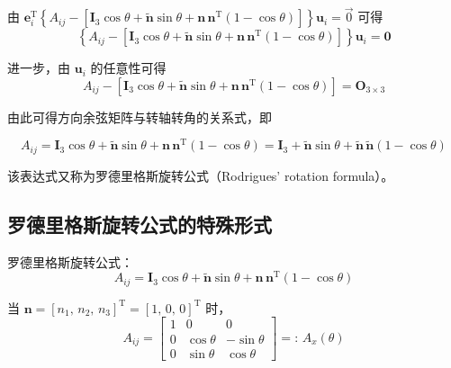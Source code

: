 由 $\boldsymbol{e}_i^{\mathrm{T}} \left\{A_{ij} - \left[\boldsymbol{I}_3 \cos\theta + \tilde{\boldsymbol{n}} \sin\theta + \boldsymbol{n}\, \boldsymbol{n}^{\mathrm{T}} (1 - \cos\theta)\right]\right\} \boldsymbol{u}_i = \vec{0}$ 可得
\begin{equation}
\left\{A_{ij} - \left[\boldsymbol{I}_3 \cos\theta + \tilde{\boldsymbol{n}} \sin\theta + \boldsymbol{n}\, \boldsymbol{n}^{\mathrm{T}} (1 - \cos\theta)\right]\right\} \boldsymbol{u}_i = \boldsymbol{0}
\end{equation}

进一步，由 $\boldsymbol{u}_i$ 的任意性可得
\begin{equation}
A_{ij} - \left[\boldsymbol{I}_3 \cos\theta + \tilde{\boldsymbol{n}} \sin\theta + \boldsymbol{n}\, \boldsymbol{n}^{\mathrm{T}} (1 - \cos\theta)\right] = \boldsymbol{O}_{3 \times 3}
\end{equation}

由此可得方向余弦矩阵与转轴转角的关系式，即
\begin{myformula}
\begin{equation}\label{eq:5.rodrigues}
A_{ij} = \boldsymbol{I}_3 \cos\theta + \tilde{\boldsymbol{n}} \sin\theta + \boldsymbol{n}\, \boldsymbol{n}^{\mathrm{T}} (1 - \cos\theta) = \boldsymbol{I}_3 + \tilde{\boldsymbol{n}} \sin\theta + \tilde{\boldsymbol{n}}\, \tilde{\boldsymbol{n}} (1 - \cos\theta)
\end{equation}
\end{myformula}

该表达式又称为罗德里格斯旋转公式（Rodrigues' rotation formula）。


\subsection{罗德里格斯旋转公式的特殊形式}

罗德里格斯旋转公式：
\begin{equation*}
A_{ij} = \boldsymbol{I}_3 \cos\theta + \tilde{\boldsymbol{n}} \sin\theta + \boldsymbol{n}\, \boldsymbol{n}^{\mathrm{T}} (1 - \cos\theta)
\end{equation*}

当 $\boldsymbol{n} = [n_1,\, n_2,\, n_3]^{\mathrm{T}} = [1,\, 0,\, 0]^{\mathrm{T}}$ 时，
\begin{equation}\label{eq:5.Ax}
A_{ij} = \begin{bmatrix} 1 & 0 & 0 \\ 0 & \cos\theta & -\sin\theta \\ 0 & \sin\theta & \cos\theta \end{bmatrix} =:\, A_x(\theta)
\end{equation}

